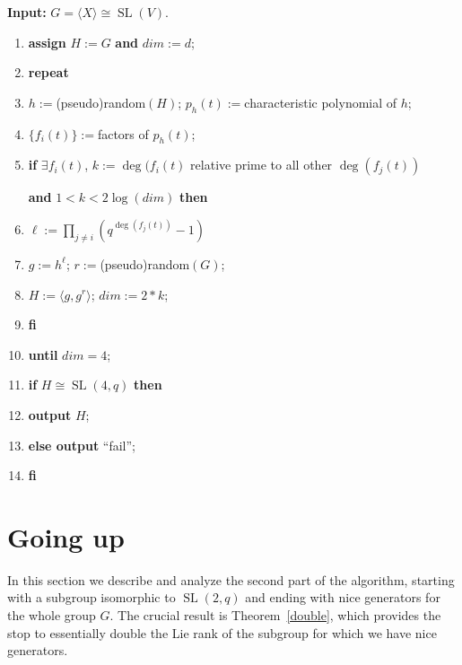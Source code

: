 \documentclass[a4paper,11pt]{article}
\def\SL{\operatorname{SL}}
\renewcommand{\bf}{\textbf} \renewcommand{\L}{\Lambda}
\begin{document}
\noindent
{\bf {Input:}} $G = \langle X \rangle \cong \SL(V)$.
\begin{enumerate}
\item {\bf {assign}} $H := G$ {\bf {and}} $dim := d$;
\item {\bf {repeat}} 
\item \hspace*{1cm} $h:=$(pseudo)random$(H)$; $p_h(t):=$characteristic
polynomial of $h$;
\item \hspace*{1cm} $\{ f_i(t) \}:=$factors of $p_h(t)$;
\item \hspace*{1cm} {\bf {if}} $\exists f_i(t)$, $k:=\deg(f_i(t)$
relative prime to all other $\deg(f_j(t))$

 \hspace*{2cm} {\bf {and}} $1<k<2 \log(dim)$ {\bf {then}}
\item \hspace*{2cm} $\ell:=\prod_{j \ne i} \left(q^{\deg(f_j(t))}-1\right)$
\item \hspace*{2cm} $g:=h^{\ell}$; $r:=$(pseudo)random$(G)$;
\item \hspace*{2cm} $H:=\langle g,g^r \rangle$; $dim := 2*k$;
\item \hspace*{1cm} {\bf {fi}}
\item {\bf {until}} $dim=4$;
\item {\bf {if}} $H \cong \SL(4,q)$ {\bf {then}}
\item \hspace*{1cm} {\bf {output}} $H$;
\item \hspace*{1cm} {\bf {else output}} ``fail'';
\item {\bf {fi}}
\end{enumerate}

\section{Going up}
\label{going up}

In this section we describe and analyze the second part of the
algorithm, starting with a subgroup isomorphic to $\SL(2,q)$ and
ending with nice generators for the whole group $G$. The crucial
result is Theorem~\ref{double}, which provides the stop to essentially
double the Lie rank of the subgroup for which we have nice generators.
\end{document}

